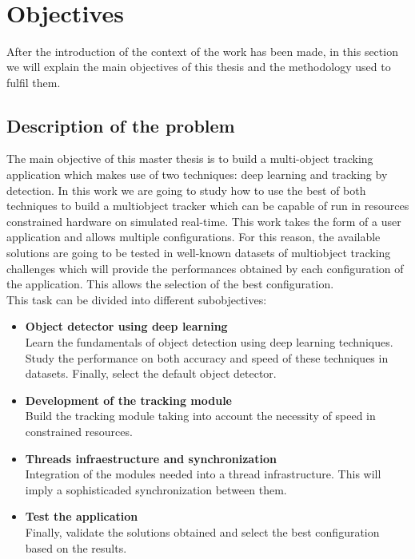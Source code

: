 \\ \ \\ \ \\ \ \\

\section{Objectives}
After the introduction of the context of the work has been made, in this section we will explain the main objectives of this thesis and the methodology used to fulfil them.

\subsection{Description of the problem}
The main objective of this master thesis is to build a multi-object tracking application which makes use of two techniques: deep learning and tracking by detection. In this work we are going to study how to use the best of both techniques to build a multiobject tracker which can be capable of run in resources constrained hardware on simulated real-time. This work takes the form of a user application and allows multiple configurations. For this reason, the available solutions are going to be tested in well-known datasets of multiobject tracking challenges which will provide the performances obtained by each configuration of the application. This allows the selection of the best configuration.\\
This task can be divided into different subobjectives:
\begin{itemize}
\item \textbf{Object detector using deep learning}\\
Learn the fundamentals of object detection using deep learning techniques. Study the performance on both accuracy and speed of these techniques in datasets. Finally, select the default object detector.
\item \textbf{Development of the tracking module}\\
Build the tracking module taking into account the necessity of speed in constrained resources.
\item \textbf{Threads infraestructure and synchronization}\\
Integration of the modules needed into a thread infrastructure. This will imply a sophisticaded synchronization between them.
\item \textbf{Test the application}\\
Finally, validate the solutions obtained and select the best configuration based on the results.
\end{itemize}

